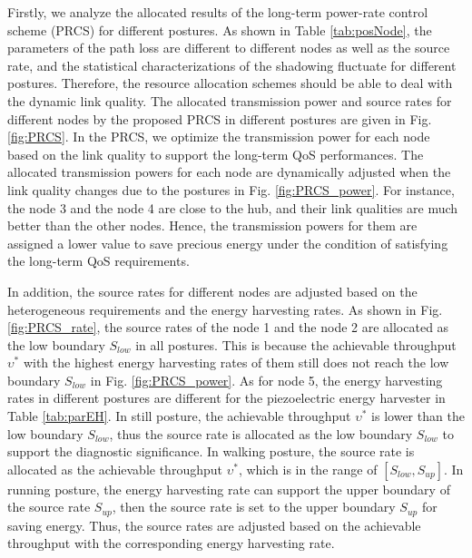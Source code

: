 \documentclass[journal,10pt]{IEEEtran}
\begin{document}
Firstly, we analyze the allocated results of the long-term power-rate control scheme (PRCS) for different postures. As shown in Table \ref{tab:posNode}, the parameters of the path loss are different to different nodes as well as the source rate, and the statistical characterizations of the shadowing fluctuate for different postures.
Therefore, the resource allocation schemes should be able to deal with the dynamic link quality. 
The allocated transmission power and source rates for different nodes by the proposed PRCS in different postures are given in Fig. \ref{fig:PRCS}. 
In the PRCS, we optimize the transmission power for each node based on the link quality to support the long-term QoS performances. The allocated transmission powers for each node are dynamically adjusted when the link quality changes due to the postures in Fig. \ref{fig:PRCS_power}. For instance, the node 3 and the node 4 are close to the hub, and their link qualities are much better than the other nodes. Hence, the transmission powers for them are assigned a lower value to save precious energy under the condition of satisfying the long-term QoS requirements. 

In addition, the source rates for different nodes are adjusted based on the heterogeneous requirements and the energy harvesting rates. As shown in Fig. \ref{fig:PRCS_rate}, the source rates of the node 1 and the node 2 are allocated as the low boundary $S_{low}$ in all postures. 
This is because the achievable throughput $\upsilon^{*}$ with the highest energy harvesting rates of them still does not reach the low boundary $S_{low}$ in Fig. \ref{fig:PRCS_power}. 
As for node 5, the energy harvesting rates in different postures are different for the piezoelectric energy harvester in Table \ref{tab:parEH}. In still posture, the achievable throughput $\upsilon^{*}$ is lower than the low boundary $S_{low}$, thus the source rate is allocated as the low boundary $S_{low}$ to support the diagnostic significance. In walking posture, the source rate is allocated as the achievable throughput $\upsilon^{*}$, which is in the range of $[S_{low},S_{up}]$. In running posture, the energy harvesting rate can support the upper boundary of the source rate $S_{up}$, then the source rate is set to the upper boundary $S_{up}$ for saving energy.
Thus, the source rates are adjusted based on the achievable throughput with the corresponding energy harvesting rate. 
\end{document}
